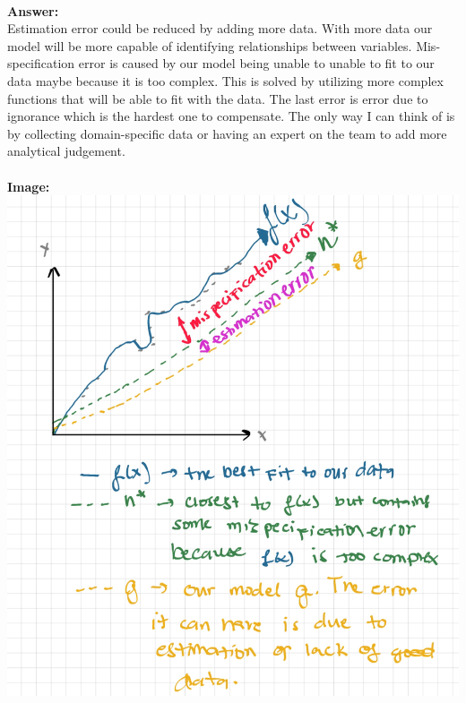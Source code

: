 \documentclass[12pt]{article}
\begin{document}
\begin{enumerate}
\\
\textbf{Answer: }\\ 
Estimation error could be reduced by adding more data. With more data our model will be more capable of identifying relationships between variables. Mis-specification error is caused by our model being unable to unable to fit to our data maybe because it is too complex. This is solved by utilizing more complex functions that will be able to fit with the data. The last error is error due to ignorance which is the hardest one to compensate. The only way I can think of is by collecting domain-specific data or having an expert on the team to add more analytical judgement. \\ 


\\
\textbf{Image: }
\includegraphics[width=\linewidth]{math342w-3.v.png} \\


\end{enumerate}
\end{document}
